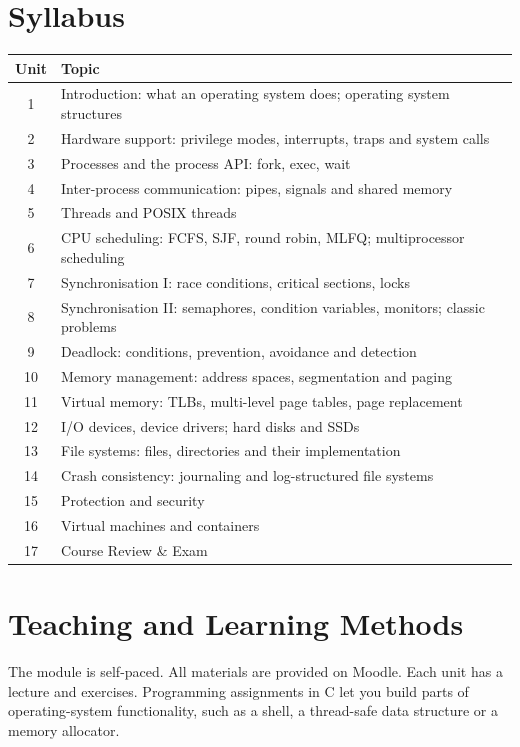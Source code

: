 \documentclass[11pt,a4paper]{article}
\begin{document}
\section{Syllabus}
\begin{tabularx}{\textwidth}{c X}
\toprule
\textbf{Unit} & \textbf{Topic} \\
\midrule
1  & Introduction: what an operating system does; operating system structures \\
2  & Hardware support: privilege modes, interrupts, traps and system calls \\
3  & Processes and the process API: fork, exec, wait \\
4  & Inter-process communication: pipes, signals and shared memory \\
5  & Threads and POSIX threads \\
6  & CPU scheduling: FCFS, SJF, round robin, MLFQ; multiprocessor scheduling \\
7  & Synchronisation I: race conditions, critical sections, locks \\
8  & Synchronisation II: semaphores, condition variables, monitors; classic problems \\
9  & Deadlock: conditions, prevention, avoidance and detection \\
10 & Memory management: address spaces, segmentation and paging \\
11 & Virtual memory: TLBs, multi-level page tables, page replacement \\
12 & I/O devices, device drivers; hard disks and SSDs \\
13 & File systems: files, directories and their implementation \\
14 & Crash consistency: journaling and log-structured file systems \\
15 & Protection and security \\
16 & Virtual machines and containers \\
17 & Course Review \& Exam \\
\bottomrule
\end{tabularx}

\section{Teaching and Learning Methods}
The module is self-paced. All materials are provided on Moodle.
Each unit has a lecture and exercises. Programming assignments in C let you build
parts of operating-system functionality, such as a shell, a thread-safe data
structure or a memory allocator.
\end{document}
